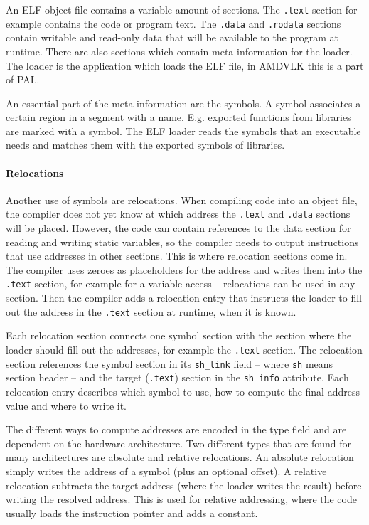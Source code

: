 An ELF object file contains a variable amount of sections. The \texttt{.text} section for example contains the code or program text. The \texttt{.data} and \texttt{.rodata} sections contain writable and read-only data that will be available to the program at runtime. There are also sections which contain meta information for the loader. The loader is the application which loads the ELF file, in AMDVLK this is a part of PAL.

An essential part of the meta information are the symbols. A symbol associates a certain region in a segment with a name. E.g. exported functions from libraries are marked with a symbol. The ELF loader reads the symbols that an executable needs and matches them with the exported symbols of libraries.

\paragraph{Relocations} Another use of symbols are relocations. When compiling code into an object file, the compiler does not yet know at which address the \texttt{.text} and \texttt{.data} sections will be placed. However, the code can contain references to the data section for reading and writing static variables, so the compiler needs to output instructions that use addresses in other sections. This is where relocation sections come in. The compiler uses zeroes as  placeholders for the address and writes them into the \texttt{.text} section, for example for a variable access -- relocations can be used in any section. Then the compiler adds a relocation entry that instructs the loader to fill out the address in the \texttt{.text} section at runtime, when it is known.

Each relocation section connects one symbol section with the section where the loader should fill out the addresses, for example the \texttt{.text} section. The relocation section references the symbol section in its \texttt{sh\_link} field -- where \texttt{sh} means section header -- and the target (\texttt{.text}) section in the \texttt{sh\_info} attribute. Each relocation entry describes which symbol to use, how to compute the final address value and where to write it.

The different ways to compute addresses are encoded in the type field and are dependent on the hardware architecture. Two different types that are found for many architectures are absolute and relative relocations. An absolute relocation simply writes the address of a symbol (plus an optional offset). A relative relocation subtracts the target address (where the loader writes the result) before writing the resolved address. This is used for relative addressing, where the code usually loads the instruction pointer and adds a constant.~\cite{BenderskyRelocations}

